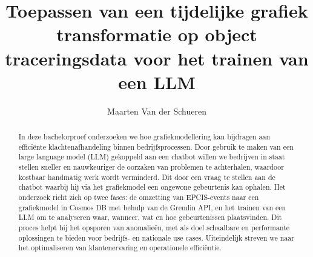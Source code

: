 \documentclass{hogent-article}
\title{Toepassen van een tijdelijke grafiek transformatie op object traceringsdata voor het trainen van een LLM}
\author{Maarten Van der Schueren}
\begin{document}
\begin{abstract}
    In deze bachelorproef onderzoeken we hoe grafiekmodellering kan bijdragen aan efficiënte klachtenafhandeling binnen bedrijfsprocessen. 
    Door gebruik te maken van een large language model (LLM) gekoppeld aan een chatbot willen we bedrijven in staat stellen sneller en nauwkeuriger de oorzaken van problemen te achterhalen, waardoor kostbaar handmatig werk wordt verminderd. 
    Dit door een vraag te stellen aan de chatbot waarbij hij via het grafiekmodel een ongewone gebeurtenis kan ophalen. Het onderzoek richt zich op twee fases: de omzetting van EPCIS-events naar een grafiekmodel in Cosmos DB met behulp van de Gremlin API, en het trainen van een LLM om te analyseren waar, wanneer, wat en hoe gebeurtenissen plaatsvinden. 
    Dit proces helpt bij het opsporen van anomalieën, met als doel schaalbare en performante oplossingen te bieden voor bedrijfs- en nationale use cases. 
    Uiteindelijk streven we naar het optimaliseren van klantenervaring en operationele efficiëntie.
\end{abstract}

\tableofcontents


\newpage
\printbibliography[heading=bibintoc]
\end{document}

